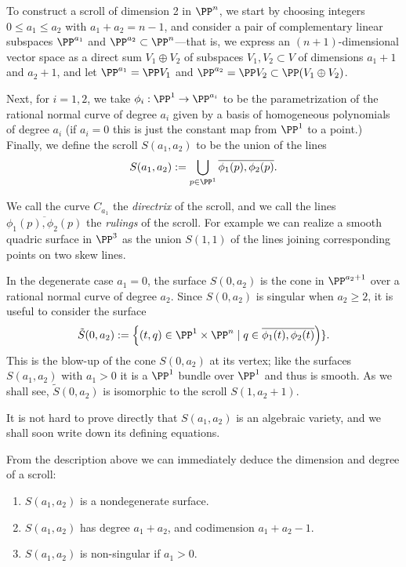 To construct a scroll of dimension 2 in $\PP^n$, we start by choosing integers $0\leq a_1 \leq a_2$ with $a_1 + a_2 = n-1$, and consider  a pair of complementary linear subspaces $\PP^{a_1}$ and $\PP^{a_2} \subset \PP^n$---that is, we express an $(n+1)$-dimensional vector space as a direct sum $ V_1 \oplus V_2$ of subspaces $V_1, V_2 \subset V$ of dimensions $a_1+1$ and $a_2+1$, and let $\PP^{a_1} = \PP V_1$ and $\PP^{a_2} = \PP V_2 \subset \PP (V_1\oplus V_2)$.

Next, for $i=1,2$, we take $\phi_i : \PP^1 \to \PP^{a_i}$ to be the parametrization of the rational normal curve of degree $a_i$ given by a basis of homogeneous polynomials of degree $a_i$ (if $a_i = 0$ this is just the constant map from $\PP^1$ to a point.) Finally, we define the scroll $S(a_1, a_2)$ to be the union of the lines
$$
S(a_1,a_2) := \bigcup_{p\in \PP^1} \overline{\phi_1(p), \phi_2(p)}.
$$

We call the curve $C_{a_{1}}$ the \emph{directrix} of the scroll, and we call the lines $ \overline{\phi_1(p), \phi_2(p)}$ the \emph{rulings} of the scroll. For example we can realize a smooth quadric surface in $\PP^3$ as the union $S(1,1)$ of the lines joining corresponding points on two skew lines. 


In the degenerate case $a_{1}= 0$, the surface $S(0,a_{2})$ is the cone
in $\PP^{a_{2}+1}$ over a rational normal curve of degree $a_{2}$. Since $S(0,a_2)$ is singular when $a_2\geq 2$, it is useful to consider the surface
$$
\tilde S(0, a_2) := \left\{ (t, q) \in \PP^1 \times \PP^n  \mid q \in \overline{\phi_1(t), \phi_2(t)}\right)\}.
$$
This is the blow-up of the cone $S(0, a_2)$ at its vertex; like the surfaces $S(a_1,a_2)$ with $a_1 > 0$ it is a $\PP^1$ bundle over $\PP^1$ and thus is smooth. As we shall see, $\tilde S(0, a_2)$ is isomorphic to the scroll $S(1, a_2+1)$.

It is not hard to prove directly that $S(a_1,a_2)$ is an algebraic variety, and we shall soon write down its defining equations.

From the description above we can immediately deduce the dimension and degree of a scroll:

\begin{proposition}
\begin{enumerate}
\item $S(a_1,a_2)$ is a nondegenerate surface.
 \item $S(a_1,a_2)$ has degree $a_1+a_2$, and codimension $a_1+a_2-1.$
 \item $S(a_{1},a_{2})$ is non-singular if $a_{1}>0$.
 \end{enumerate}
\end{proposition}\label{deg and codim}

